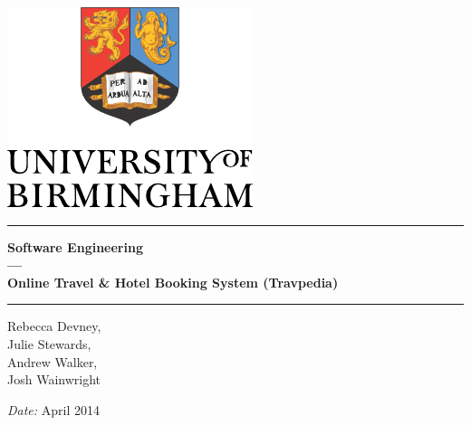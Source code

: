 \begin{titlepage}
	\begin{center}
	\vspace*{\fill}

	\centering
	\includegraphics[scale=1.2]{Logo.pdf}
	\vfill

	\hrule
	{\LARGE\bf Software Engineering \\
		--- \\
		Online Travel \& Hotel Booking System (Travpedia)\\[0.4cm]}
	\hrule

	\vfill

	\vfill
		Rebecca Devney,\\
		Julie Stewards,\\
		Andrew Walker,\\
		Josh Wainwright
	\vfill

	\vfill
	\textit{Date:} April 2014
	\vfill
	\vfill

	\end{center}
\end{titlepage}


